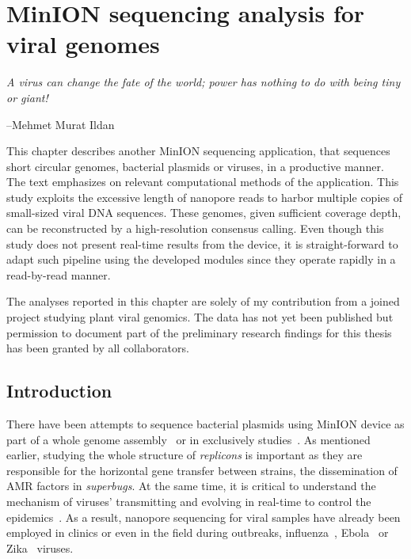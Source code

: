 \chapter{MinION sequencing analysis for viral genomes}\label{ch:concatemers}
\thispagestyle{empty}
\vspace*{\fill}
\epigraph{\emph{A virus can change the fate of the world; power has nothing to do with being tiny or giant!}}
{--Mehmet Murat Ildan}

\clearpage

This chapter describes another MinION sequencing application, that sequences short circular genomes, \EG{} bacterial plasmids or viruses, in a productive manner. The text emphasizes on relevant computational methods of the application. 
This study exploits the excessive length of nanopore reads to harbor multiple copies of small-sized viral DNA sequences. These genomes, given sufficient coverage depth, can be reconstructed by a high-resolution consensus calling. 
Even though this study does not present real-time results from the device, it is straight-forward to adapt such pipeline using the developed modules since they operate rapidly in a read-by-read manner.

The analyses reported in this chapter are solely of my contribution from a joined project studying plant viral genomics. The data has not yet been published but permission to document part of the preliminary research findings for this thesis has been granted by all collaborators.
\section{Introduction}
There have been attempts to sequence bacterial plasmids using MinION device as part of a whole genome assembly~\cite{Lemon2017M15,Wick2017M12} or in exclusively studies~\cite{Li2018M13,Lu2018plamids}. As mentioned earlier, studying the whole structure of \emph{replicons} is important as they are responsible for the horizontal gene transfer between strains, \EG{} the dissemination of AMR factors in \emph{superbugs}.
At the same time, it is critical to understand the mechanism of viruses' transmitting and evolving in real-time to control the epidemics~\cite{GardyLR2015,AndersenSM2015,HolmesDR2016,DudasCB2017}.
As a result, nanopore sequencing for viral samples have already been employed in clinics or even in the field during outbreaks, \EG{} influenza~\cite{Wang2015minion}, Ebola~\cite{QuickLD2016} or Zika~\cite{Quick2017GP} viruses.

